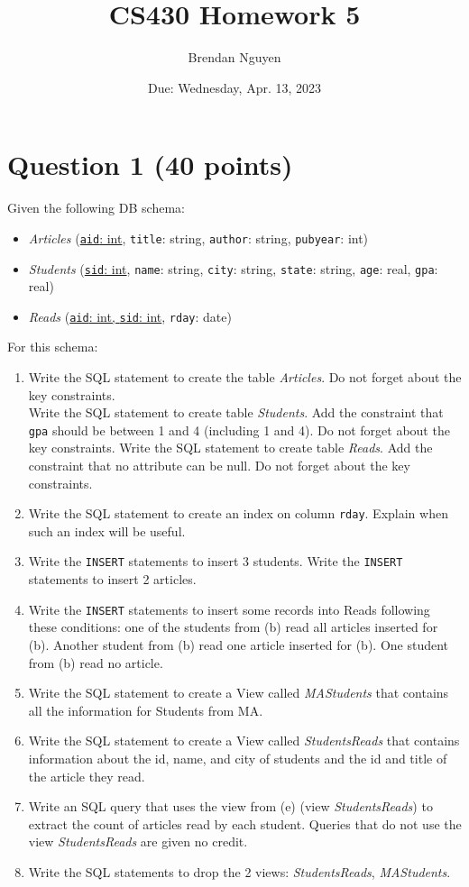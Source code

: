 \documentclass[letterpaper, 11pt]{article}
\title{CS430 Homework 5}
\author{Brendan Nguyen}
\date{Due: Wednesday, Apr. 13, 2023}
\begin{document}
\maketitle

\section*{Question 1 (40 points)}

Given the following DB schema:
\begin{itemize}
    \item \textit{Articles} (\underline{\texttt{aid}: int}, \texttt{title}: string, \texttt{author}: string, \texttt{pubyear}: int)
    \item \textit{Students} (\underline{\texttt{sid}: int}, \texttt{name}: string, \texttt{city}: string, \texttt{state}: string, \texttt{age}: real, \texttt{gpa}: real)
    \item \textit{Reads} (\underline{\texttt{aid}: int, \texttt{sid}: int}, \texttt{rday}: date)
\end{itemize}

For this schema:
\begin{enumerate}[label={\alph*})]
    \item Write the SQL statement to create the table \textit{Articles}. Do not forget about the key constraints.\\
    Write the SQL statement to create table \textit{Students}. Add the constraint that \texttt{gpa} should be between 1 and 4 (including 1 and 4). Do not forget about the key constraints. Write the SQL statement to create table \textit{Reads}. Add the constraint that no attribute can be null. Do not forget about the key constraints.
    \item Write the SQL statement to create an index on column \texttt{rday}. Explain when such an index will be useful.
    \item Write the \texttt{INSERT} statements to insert 3 students. Write the \texttt{INSERT} statements to insert 2 articles.
    \item Write the \texttt{INSERT} statements to insert some records into Reads following these conditions: one of the students from (b) read all articles inserted for (b). Another student from (b) read one article inserted for (b). One student from (b) read no article. 
    \item Write the SQL statement to create a View called \textit{MAStudents} that contains all the information for Students from MA.
    \item Write the SQL statement to create a View called \textit{StudentsReads} that contains information about the id, name, and city of students and the id and title of the article they read.
    \item Write an SQL query that uses the view from (e) (view \textit{StudentsReads}) to extract the count of articles read by each student. Queries that do not use the view \textit{StudentsReads} are given no credit.
    \item Write the SQL statements to drop the 2 views: \textit{StudentsReads}, \textit{MAStudents}.
\end{enumerate}
\end{document}
